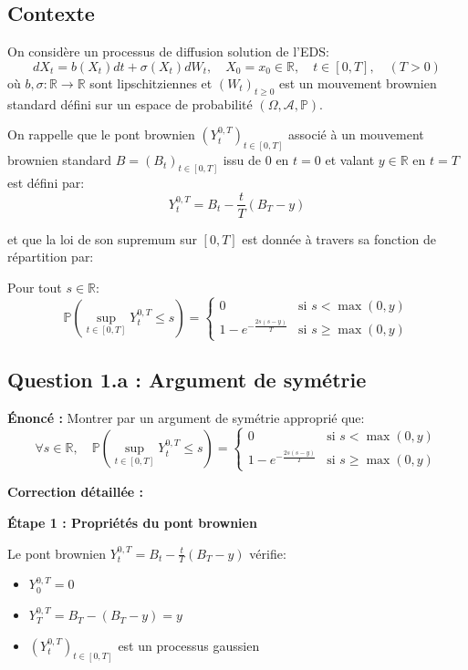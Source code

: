 \documentclass[12pt,a4paper]{article}
\theoremstyle{definition}
\newcommand{\R}{\mathbb{R}}
\newcommand{\prob}{\mathbb{P}}
\begin{document}
\subsection{Contexte}

On considère un processus de diffusion solution de l'EDS:
\[
dX_t = b(X_t)dt + \sigma(X_t)dW_t, \quad X_0 = x_0 \in \R, \quad t \in [0,T], \quad (T > 0)
\]
où $b, \sigma : \R \to \R$ sont lipschitziennes et $(W_t)_{t \geq 0}$ est un mouvement brownien standard défini sur un espace de probabilité $(\Omega, \mathcal{A}, \prob)$.

On rappelle que le pont brownien $(Y_t^{0,T})_{t \in [0,T]}$ associé à un mouvement brownien standard $B = (B_t)_{t \in [0,T]}$ issu de 0 en $t = 0$ et valant $y \in \R$ en $t = T$ est défini par:
\[
Y_t^{0,T} = B_t - \frac{t}{T}(B_T - y)
\]

et que la loi de son supremum sur $[0,T]$ est donnée à travers sa fonction de répartition par:

Pour tout $s \in \R$:
\[
\prob\left( \sup_{t \in [0,T]} Y_t^{0,T} \leq s \right) = 
\begin{cases}
0 & \text{si } s < \max(0, y) \\
1 - e^{-\frac{2s(s-y)}{T}} & \text{si } s \geq \max(0, y)
\end{cases}
\]

\subsection{Question 1.a : Argument de symétrie}

\textbf{Énoncé :} Montrer par un argument de symétrie approprié que:
\[
\forall s \in \R, \quad \prob\left( \sup_{t \in [0,T]} Y_t^{0,T} \leq s \right) = 
\begin{cases}
0 & \text{si } s < \max(0, y) \\
1 - e^{-\frac{2s(s-y)}{T}} & \text{si } s \geq \max(0, y)
\end{cases}
\]

\textbf{Correction détaillée :}

\textbf{Étape 1 : Propriétés du pont brownien}

Le pont brownien $Y_t^{0,T} = B_t - \frac{t}{T}(B_T - y)$ vérifie:
\begin{itemize}
    \item $Y_0^{0,T} = 0$
    \item $Y_T^{0,T} = B_T - (B_T - y) = y$
    \item $(Y_t^{0,T})_{t \in [0,T]}$ est un processus gaussien
\end{itemize}
\end{document}
